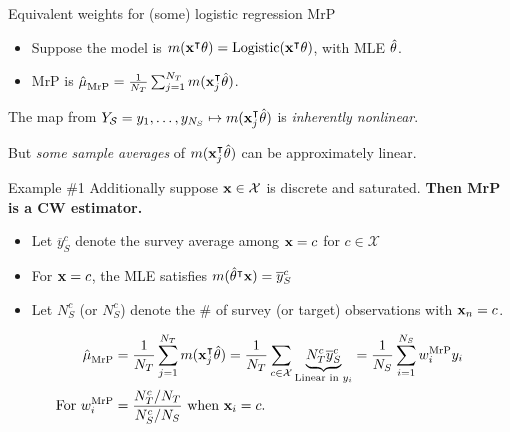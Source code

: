 \begin{frame}[t]{Equivalent weights for (some) logistic regression MrP}
%
\begin{itemize}
    \item Suppose the model is $m(\mathbf{x}^\intercal \theta) = \mathrm{Logistic}(\mathbf{x}^\intercal \theta)$, with MLE $\hat{\theta}$.
    \item MrP is $\hat{\mu}^{}_{\mathrm{MrP}} = \frac{1}{{N_T}} \sum_{j=1}^{N_T} m(\mathbf{x}_j^\intercal \hat{\theta})$.
\end{itemize}

The map from $Y_{\mathcal{S}} = y_1, \ldots, y_{{N_S}} \mapsto m(\mathbf{x}_j^\intercal \hat{\theta})$ is
\emph{inherently nonlinear}.

But \emph{some sample averages}
of $m(\mathbf{x}_j^\intercal \hat{\theta})$ can be approximately linear.

\begin{block}{Example \#1}
Additionally suppose $\mathbf{x} \in \mathcal{X}$ is discrete and saturated.
        \textbf{Then MrP is a CW estimator.}
\end{block}

\pause
\def\ybar{\overline{y}}
\def\Ntarc{N_T^c}
\def\Nsurc{N_S^c}
%
\begin{itemize}
    \item Let $\ybar_S^c$ denote the survey average among $\mathbf{x} = c$ for $c \in \mathcal{X}$
    \item For $\mathbf{x} = c$, the MLE satisfies $m(\thetahat^\trans \x) = \ybar_S^c$
    \item Let $\Nsurc$ (or $\Nsurc$) denote the \# of survey (or target) observations with $\mathbf{x}_n = c$.
\end{itemize}
%
$$
\begin{aligned}
\muhat_\mrp ={}& \meantar \m(\x_j^\trans \thetahat)
            = \frac{1}{\Ntar} \sum_{c \in \mathcal{X}}
            \underbrace{\Ntarc \ybar_S^c}_{\textrm{Linear in }\y_i}
        = \meansur \w_i^\mrp \y_i
\\ \textrm{For }
\w_i^\mrp ={}&
    \frac{\Ntarc / \Ntar}{\Nsurc / \Nsur} \textrm{ when }\x_i=c.
\end{aligned}
$$

\end{frame}




